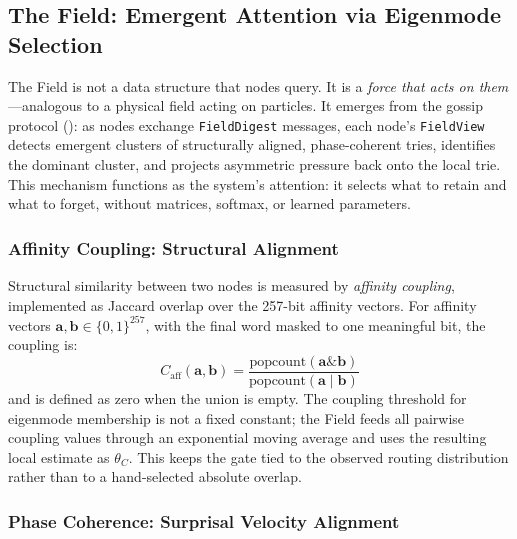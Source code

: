\subsection{The Field: Emergent Attention via Eigenmode Selection}
\label{sec:field}

The Field is not a data structure that nodes query.  It is a
\emph{force that acts on them}---analogous to a physical field acting on
particles.  It emerges from the gossip protocol
(): as nodes exchange \texttt{FieldDigest} messages,
each node's \texttt{FieldView} detects emergent clusters of
structurally aligned, phase-coherent tries, identifies the dominant
cluster, and projects asymmetric pressure back onto the local trie.
This mechanism functions as the system's attention: it selects what to
retain and what to forget, without matrices, softmax, or learned
parameters.

\subsubsection{Affinity Coupling: Structural Alignment}

Structural similarity between two nodes is measured by
\emph{affinity coupling}, implemented as Jaccard overlap over the
257-bit affinity vectors.  For affinity vectors
$\mathbf{a}, \mathbf{b} \in \{0,1\}^{257}$, with the final word masked
to one meaningful bit, the coupling is:
\begin{equation}
  C_{\text{aff}}(\mathbf{a}, \mathbf{b})
    = \frac{\text{popcount}(\mathbf{a} \mathbin{\&} \mathbf{b})}
           {\text{popcount}(\mathbf{a} \mathbin{|} \mathbf{b})}
  \label{eq:field_affinity_coupling}
\end{equation}
and is defined as zero when the union is empty.  The coupling threshold
for eigenmode membership is not a fixed constant; the Field feeds all
pairwise coupling values through an exponential moving average and uses
the resulting local estimate as $\theta_C$.  This keeps the gate tied to
the observed routing distribution rather than to a hand-selected
absolute overlap.

\subsubsection{Phase Coherence: Surprisal Velocity Alignment}


